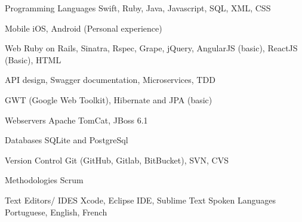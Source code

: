 

\begin{cvskills}
	
	\cvskill
	{Programming Languages} %
	{Swift, Ruby, Java, Javascript, SQL, XML, CSS} %
	
	\cvskill
	{Mobile} %
	{iOS, Android (Personal experience) } %
	
	\cvskill
	{Web} %
	{Ruby on Rails, Sinatra, Rspec, Grape, jQuery, AngularJS (basic), ReactJS (Basic), HTML}
	
	\cvskill
	{} %
	{API design, Swagger documentation, Microservices, TDD}
	
	\cvskill
	{} %
	{GWT (Google Web Toolkit), Hibernate and JPA (basic) }
	
	\cvskill
	{Webservers} %
	{Apache TomCat, JBoss 6.1} %
	
	\cvskill
	{Databases}
	{SQLite and PostgreSql}
	
	\cvskill
	{Version Control}
	{Git (GitHub, Gitlab, BitBucket), SVN, CVS}
	
	\cvskill
	{Methodologies}
	{Scrum}
	
	\cvskill
	{Text Editors/ IDES}
	{Xcode, Eclipse IDE, Sublime Text}
	\cvskill
	{Spoken Languages} %
	{Portuguese, English, French} %
	
\end{cvskills}
